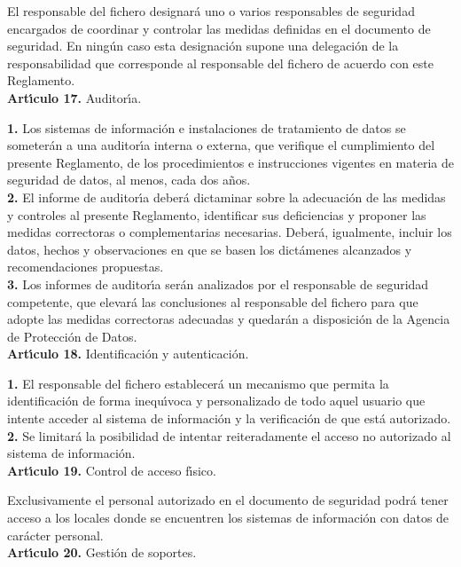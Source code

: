 El responsable del fichero designar\'a uno o varios responsables de seguridad 
encargados de coordinar y controlar las medidas definidas en el documento de 
seguridad. En ning\'un caso esta designaci\'on supone una delegaci\'on de la 
responsabilidad que corresponde al responsable del fichero de acuerdo con este 
Reglamento.
\vspace{0.3cm}\\
{\large {\bf Art\'{\i}culo 17.} Auditor\'{\i}a.}

{\bf 1.} Los sistemas de informaci\'on e instalaciones de tratamiento de datos 
se someter\'an a una auditor\'{\i}a interna o externa, que verifique el 
cumplimiento del presente Reglamento, de los procedimientos e instrucciones 
vigentes en materia de seguridad de datos, al menos, cada dos a\~nos.\\

{\bf 2.} El informe de auditor\'{\i}a deber\'a dictaminar sobre la adecuaci\'on 
de las medidas y controles al presente Reglamento, identificar sus deficiencias 
y proponer las medidas correctoras o complementarias necesarias. Deber\'a, 
igualmente, incluir los datos, hechos y observaciones en que se basen los 
dict\'amenes alcanzados y recomendaciones propuestas.\\

{\bf 3.} Los informes de auditor\'{\i}a ser\'an analizados por el responsable 
de seguridad competente, que elevar\'a las conclusiones al responsable del 
fichero para que adopte las medidas correctoras adecuadas y quedar\'an a 
disposici\'on de la Agencia de Protecci\'on de Datos.
\vspace{0.3cm}\\
{\large {\bf Art\'{\i}culo 18.} Identificaci\'on y autenticaci\'on.}

{\bf 1.} El responsable del fichero establecer\'a un mecanismo que permita la 
identificaci\'on de forma inequ\'{\i}voca y personalizado de todo aquel usuario 
que intente acceder al sistema de informaci\'on y la verificaci\'on de que 
est\'a autorizado.\\

{\bf 2.} Se limitar\'a la posibilidad de intentar reiteradamente el acceso no 
autorizado al sistema de informaci\'on.
\vspace{0.3cm}\\
{\large {\bf Art\'{\i}culo 19.} Control de acceso f\'{\i}sico.}

Exclusivamente el personal autorizado en el documento de seguridad podr\'a 
tener acceso a los locales donde se encuentren los sistemas de informaci\'on 
con datos de car\'acter personal.
\vspace{0.3cm}\\
{\large {\bf Art\'{\i}culo 20.} Gesti\'on de soportes.}

